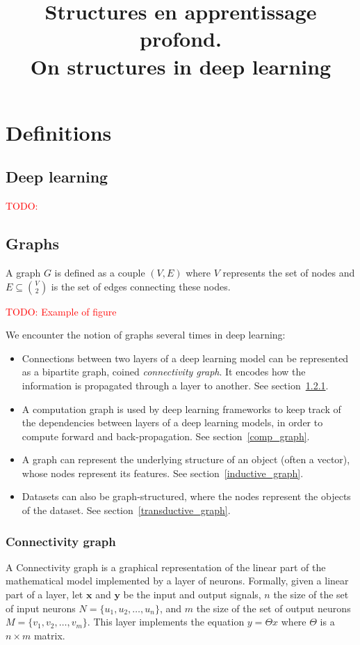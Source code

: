 \documentclass{article}
\title{Structures en apprentissage profond.\\ On structures in deep learning}
\theoremstyle{definition}
\newcommand{\todo}[1]{\textcolor{red}{TODO: #1}}
\begin{document}
\section{Definitions}

\subsection{Deep learning}

\todo{}

\subsection{Graphs}

A graph $G$ is defined as a couple $(V,E)$ where $V$ represents the set of nodes and $E \subseteq\binom{V}{2}$ is the set of edges connecting these nodes.

\todo{Example of figure}

We encounter the notion of graphs several times in deep learning:
\begin{itemize}
\item Connections between two layers of a deep learning model can be represented as a bipartite graph, coined \emph{connectivity graph}. It encodes how the information is propagated through a layer to another. See section~\ref{con_graph}.
\item A computation graph is used by deep learning frameworks to keep track of the dependencies between layers of a deep learning models, in order to compute forward and back-propagation. See section~\ref{comp_graph}.
\item A graph can represent the underlying structure of an object (often a vector), whose nodes represent its features. See section~\ref{inductive_graph}.
\item Datasets can also be graph-structured, where the nodes represent the objects of the dataset. See section~\ref{transductive_graph}.
\end{itemize}

\subsubsection{Connectivity graph}
\label{con_graph}

A Connectivity graph is a graphical representation of the linear part of the mathematical model implemented by a layer of neurons.
Formally, given a linear part of a layer, let $\textbf{x}$ and $\textbf{y}$ be the input and output signals, $n$ the size of the set of input neurons $N = \{u_1, u_2, \ldots, u_n\}$, and $m$ the size of the set of output neurons $M = \{v_1, v_2, \ldots, v_m\}$. This layer implements the equation $y = \Theta x$ where $\Theta$ is a $n \times m$ matrix.
\end{document}
